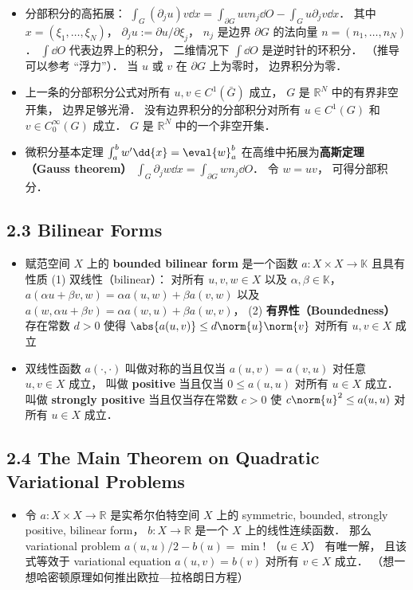 \begin{itemize}
\item 分部积分的高拓展： $\int_G (\partial_j u) v\dd{x} = \int_{\partial G} uvn_j \dd{O} - \int_G u \partial_j v\dd{x}$． 其中 $x = (\xi_1, \dots, \xi_N)$， $\partial_j u := \partial u/\partial\xi_j$， $n_j$ 是边界 $\partial G$ 的法向量 $n = (n_1, \dots, n_N)$． $\int\dd{O}$ 代表边界上的积分， 二维情况下 $\int\dd{O}$ 是逆时针的环积分． （推导可以参考 “浮力”）． 当 $u$ 或 $v$ 在 $\partial G$ 上为零时， 边界积分为零．

\item 上一条的分部积分公式对所有 $u, v \in C^1(\bar G)$ 成立， $G$ 是 $\mathbb R^N$ 中的有界非空开集， 边界足够光滑． 没有边界积分的分部积分对所有 $u \in C^1(G)$ 和 $v \in C_0^\infty(G)$ 成立． $G$ 是 $\mathbb R^N$ 中的一个非空开集．

\item 微积分基本定理 $\int_a^b w' \dd{x} = \eval{w}_a^b$ 在高维中拓展为\textbf{高斯定理（Gauss theorem）} $\int_G \partial_j w \dd{x} = \int_{\partial G} wn_j\dd{O}$． 令 $w = uv$， 可得分部积分．
\end{itemize}

\subsection{2.3 Bilinear Forms}
\begin{itemize}
\item 赋范空间 $X$ 上的 \textbf{bounded bilinear form} 是一个函数 $a: X\times X\to\mathbb K$ 且具有性质 (1) 双线性（bilinear）： 对所有 $u, v, w\in X$ 以及 $\alpha, \beta \in \mathbb K$， $a(\alpha u + \beta v, w) = \alpha a(u, w) + \beta a(v, w)$ 以及 $a(w, \alpha u + \beta v) = \alpha a(w, u) + \beta a(w, v)$， (2) \textbf{有界性（Boundedness）} 存在常数 $d > 0$ 使得 $\abs{a(u, v)} \le d\norm{u}\norm{v}$ 对所有 $u, v\in X$ 成立

\item 双线性函数 $a(\cdot,\cdot)$ 叫做对称的当且仅当 $a(u, v) = a(v, u)$ 对任意 $u, v\in X$ 成立， 叫做 \textbf{positive} 当且仅当 $0\le a(u,u)$ 对所有 $u\in X$ 成立． 叫做 \textbf{strongly positive} 当且仅当存在常数 $c > 0$ 使 $c\norm{u}^2 \le a(u, u)$ 对所有 $u\in X$ 成立．
\end{itemize}

\subsection{2.4 The Main Theorem on Quadratic Variational Problems}
\begin{itemize}
\item 令 $a: X\times X\to\mathbb R$ 是实希尔伯特空间 $X$ 上的 symmetric, bounded, strongly positive, bilinear form， $b: X\to\mathbb R$ 是一个 $X$ 上的线性连续函数． 那么 variational problem $a(u, u)/2 - b(u) = \min!$ （$u\in X$） 有唯一解， 且该式等效于 variational equation $a(u, v) = b(v)$ 对所有 $v\in X$ 成立． （想一想哈密顿原理如何推出欧拉—拉格朗日方程）
\end{itemize}

